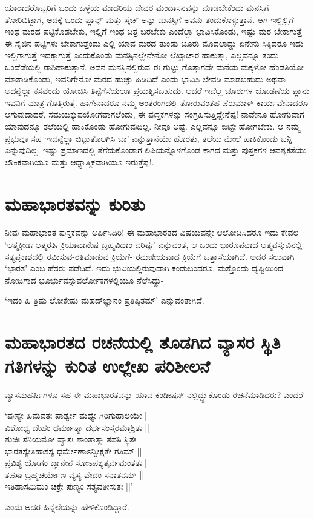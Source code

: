 ಯಾರಾದರೊಬ್ಬರಿಗೆ ಒಂದು ಒಳ್ಳೆಯ ಮಾದರಿಯ ದೇವರ ಮಂದಾಸನವನ್ನು ಮಾಡಬೇಕೆಂದು ಮನಸ್ಸಿಗೆ ತೋರಿಬಿಟ್ಟಾಗ, ಅದಕ್ಕೆ ಒಂದು ಪ್ಲಾನ್ೞ್ ಮತ್ತು ಸ್ಕೆಚ್ ಅನ್ನು ಮನಸ್ಸಿಗೆ ಅವನು ತಂದುಕೊಳ್ಳುತ್ತಾನೆ. ಆಗ ಇಲ್ಲಿಲ್ಲಿಗೆ ಇಂಥ ಮರದ ಪಟ್ಟಿಕೊಡಬೇಕು, ಇಲ್ಲಿಗೆ ಇಂಥ ಚಿತ್ರ ಬರಬೇಕು ಎಂದೆಲ್ಲಾ ಭಾವಿಸಿಕೊಂಡು, ಇಷ್ಟು ಮರ ಬೇಕಾಗುತ್ತೆ ಈ ಸೈಜಿನ ಪಟ್ಟಿಗಳು ಬೇಕಾಗುತ್ತೆಂದು ಎಲ್ಲಿ ಯಾವ ಮರದ ತುಂಡು ಚೂರು ಮೊದಲಾದ್ದು ಏನೇನು ಸಿಕ್ಕಿದರೂ ಇದು ಇಲ್ಲಿಗಾಗುತ್ತೆ ಇದಕ್ಕಾಗುತ್ತೆ ಎಂದುಕೊಂಡು ಮನಸ್ಸಿನಲ್ಲೇನೇನೋ ಲೆಖ್ಖಾಚಾರ ಹಾಕುತ್ತಾ, ಎಲ್ಲವನ್ನೂ ತಂದು ಒಂದೆಡೆಯಲ್ಲಿ ರಾಶಿಹಾಕುತ್ತಾನೆ. ಅವನ ಮನಸ್ಸಿನಲ್ಲಿರುವ ಈ ಗುಟ್ಟು ಗೊತ್ತಾಗದೇ ಮನೆಯ ಮಕ್ಕಳೋ ಹೆಂಡತಿಯೋ ಮಾತಾಡಿಕೊಂಡು, ಇವನಿಗೇನೋ ಮರದ ಹುಚ್ಚು ಹಿಡಿದಿದೆ ಎಂದು ಭಾವಿಸಿ ಲೇವಡಿ ಮಾಡಬಹುದು ಅಥವಾ ಅದನ್ನೆಲ್ಲಾ ಕಸವೆಂದು ಯೋಚಿಸಿ ತಿಪ್ಪೆಗೆಸೆಯಲೂ ಪ್ರಯತ್ನಿಸಬಹುದು. ಆದರೆ ಇವೆಲ್ಲ ಚೂರುಗಳ ಜೋಡಣೆಯ ಪ್ಲಾನು ಇವನಿಗೆ ಮಾತ್ರ ಗೊತ್ತಿರುತ್ತೆ. ಹಾಗೇನಾದರೂ ನಮ್ಮ ಅಂತರಂಗದಲ್ಲಿ ತೋರುವಂತಹ ಪೆರುಮಾಳ್ ಕಾರ್ಯವೇನಾದರೂ ಆಗುವುದಾದರೆ, ಸಮಯಕ್ಕುಪಯೋಗವಾಗಲೆಂದು, ಈ ಪುಸ್ತಕಗಳನ್ನು ಸಂಗ್ರಹಿಸುತ್ತಿದ್ದೇನೆಪ್ಪ! ನಾವೇನೂ ಹೋಗುವಾಗ ಯಾವುದನ್ನೂ ತಲೆಯಲ್ಲಿ ಹಾಕಿಕೊಂಡು ಹೋಗುವುದಿಲ್ಲ. ನೀವೂ ಅಷ್ಟೆ. ಎಲ್ಲವನ್ನೂ ಬಿಟ್ಟೇ ಹೋಗಬೇಕು. ಆ ನಮ್ಮ ಪ್ರಭುವೂ ಸಹ `ಇದನ್ನೆಲ್ಲಾ ಬಿಟ್ಟುತೊಲಗಿಸಿ ಬಾ' ಎನ್ನುತ್ತಾನೆಯೇ ಹೊರತು, ತಲೆಯ ಮೇಲೆ ಹಾಕಿಕೊಂಡು ಬನ್ನಿ ಎನ್ನುವುದಿಲ್ಲ. ಇಷ್ಟು  ಪ್ರಮಾಣದಲ್ಲಿ ತೆಗೆದುಕೊಂಡಾಗ ಲಿಪಿಯನ್ನೊಳಗೊಂಡ ಕಾಗದ ಮತ್ತು ಪುಸ್ತಕಗಳ ಆವಶ್ಯಕತೆಯು ಲೌಕಿಕವಾಗಿಯೂ ಮತ್ತು ಆಧ್ಯಾತ್ಮಿಕವಾಗಿಯೂ ಇರುತ್ತೆಪ್ಪ!.

\section*{ಮಹಾಭಾರತವನ್ನು ಕುರಿತು}

ನೀವು ಮಹಾಭಾರತ ಪುಸ್ತಕವನ್ನು ಅರ್ಪಿಸಿದಿರಿ! ಈ ಮಹಾಭಾರತದ ವಿಷಯವನ್ನೇ ಆಲೋಚಿಸಿದರೂ ಇದು ಕೇವಲ `ಆತ್ಮಕ್ರೀಡಃ ಆತ್ಮರತಿಃ\label{118} ಕ್ರಿಯಾವಾನೇಷ ಬ್ರಹ್ಮವಿದಾಂ ವರಿಷ್ಠಃ' ಎನ್ನುವಂತೆ, ಆ ಒಂದು ಭಾರೂಪವಾದ ಆತ್ಮವಸ್ತುವಿನಲ್ಲಿ ಸತ್ಯಪ್ರಕಾಶದಲ್ಲಿ ರಮಿಸುವ-ರತಿಮಾಡುವ ಕ್ರಿಯೆಗೆ- ರಮಣೀಯವಾದ ಕ್ರಿಯೆಗೆ ಒತ್ತಾಸೆಯಾಗಿದೆ. ಅದರ ಸಲುವಾಗಿ `ಭಾರತ' ಎಂಬ ಹೆಸರು ಪಡೆದಿದೆ. ಇದು ಭುವಿಯಲ್ಲಿರುವುದಾಗಿ ಕಂಡುಬಂದರೂ, ಮತ್ತೊಂದು ದೃಷ್ಟಿಯಿಂದ ನೋಡಿಗಾದ ಭೂರ್ಭುವಸ್ಸುವರ್ಲೋಕಗಳಲ್ಲಿಯೂ ನೆಲೆಸಿದ್ದು-

\begin{shloka}
`ಇದಂ ಹಿ ತ್ರಿಷು ಲೋಕೇಷು\label{118a} ಮಹದ್‌ಜ್ಞಾನಂ ಪ್ರತಿಷ್ಠಿತಮ್' ಎನ್ನುವಂತಾಗಿದೆ.
\end{shloka}

\section*{ಮಹಾಭಾರತದ ರಚನೆಯಲ್ಲಿ ತೊಡಗಿದ ವ್ಯಾಸರ ಸ್ಥಿತಿ ಗತಿಗಳನ್ನು ಕುರಿತ ಉಲ್ಲೇಖ ಪರಿಶೀಲನೆ}

ವ್ಯಾಸಮಹರ್ಷಿಗಳೂ ಸಹ ಈ ಮಹಾಭಾರತವನ್ನು ಯಾವ ಕಂಡೀಷನ್ ನಲ್ಲಿದ್ದ್ದುಕೊಂಡು ರಚನೆಮಾಡಿದರು? ಎಂದರೆ-

\begin{shloka}
`ಪುಣ್ಯೇ ಹಿಮವತಃ ಪಾರ್ಶ್ವೇ ಮಧ್ಯೇ ಗಿರಿಗುಹಾಲಯೇ |\label{118b}\\
ವಿಶೋಧ್ಯ ದೇಹಂ ಧರ್ಮಾತ್ಮಾ ದರ್ಭಸಂಸ್ತರಮಾಶ್ರಿತಃ ||\\
ಶುಚಿಃ ಸನಿಯಮೋ ವ್ಯಾಸಃ ಶಾಂತಾತ್ಮಾ ತಪಸಿ ಸ್ಥಿತಃ |\\
ಭಾರತಸ್ಯೇತಿಹಾಸಸ್ಯ ಧರ್ಮೇಣಾಽನ್ವೀಕ್ಷತೇ ಗತಿಮ್ ||\\
ಪ್ರವಿಶ್ಯ ಯೋಗಂ ಜ್ಞಾನೇನ ಸೋಽಪಶ್ಯತ್ಸರ್ವಮಂತತಃ |\\
ತಪಸಾ ಬ್ರಹ್ಮಚರ್ಯೇಣ ವ್ಯಸ್ಯ ವೇದಂ ಸನಾತನಮ್ ||\\
ಇತಿಹಾಸಮಿಮಂ ಚಕ್ರೇ ಪುಣ್ಯಂ ಸತ್ಯವತೀಸುತಃ ||'
\end{shloka}
ಎಂದು ಅದರ ಹಿನ್ನೆಲೆಯನ್ನು ಹೇಳಿಕೊಂಡಿದ್ದಾರೆ.

